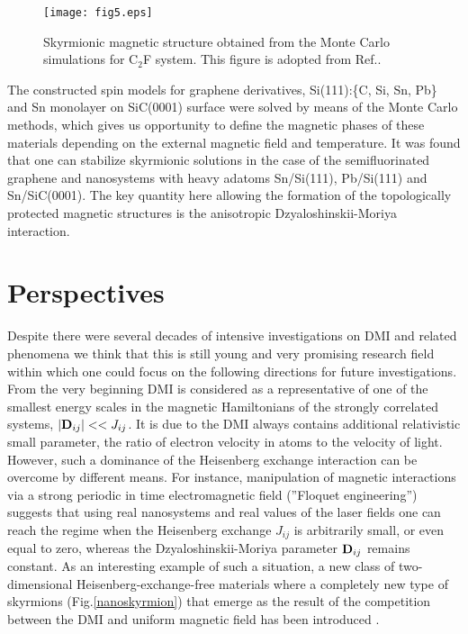 \documentclass[aps,prl,twocolumn,showpacs,amsmath,amssymb]{revtex4-1}
\begin{document}
\begin{figure}[!h]
\texttt{[image: fig5.eps]}
\caption{Skyrmionic magnetic structure obtained from the Monte Carlo simulations for C$_2$F system. This figure is adopted from Ref.\cite{C2F}.}
\label{skyrmion}
\end{figure}

The constructed spin models for graphene derivatives, Si(111):\{C, Si, Sn, Pb\} and Sn monolayer on SiC(0001) surface
 were solved by means of the Monte Carlo methods, which gives us opportunity to define the magnetic phases of these materials depending on the external magnetic field and temperature. It was found that one can stabilize skyrmionic solutions in the case of the semifluorinated  graphene and nanosystems with heavy adatoms Sn/Si(111), Pb/Si(111) and Sn/SiC(0001). The key quantity here allowing the formation of the topologically protected magnetic structures is the anisotropic Dzyaloshinskii-Moriya interaction.

\section{Perspectives}
Despite there were several decades of intensive investigations on DMI and related phenomena we think that this is still young and very promising research field within which one could focus on the following directions for future investigations. From the very beginning DMI is considered as a representative of one of the smallest energy scales in the magnetic Hamiltonians of the strongly correlated systems, $|{\bf D}_{ij}| < <J_{ij}$. It is due to the DMI always contains additional relativistic small parameter, the ratio of electron velocity in atoms to the velocity of light. However, such a dominance of the Heisenberg exchange interaction can be overcome by different means. For instance, manipulation of magnetic interactions via a strong periodic in time electromagnetic field \cite{Stepanov1} (''Floquet engineering'') suggests that using real nanosystems and real values of the laser fields one can reach the regime when the Heisenberg exchange $J_{ij}$ is arbitrarily small, or even equal to zero, whereas the Dzyaloshinskii-Moriya parameter ${\bf D}_{ij}$ remains constant. As an interesting example of such a situation, a new class of two-dimensional Heisenberg-exchange-free materials where a completely new type of skyrmions (Fig.\ref{nanoskyrmion}) that emerge as the result of the competition between the DMI and uniform magnetic field has been introduced \cite{Stepanov2}.
\end{document}
